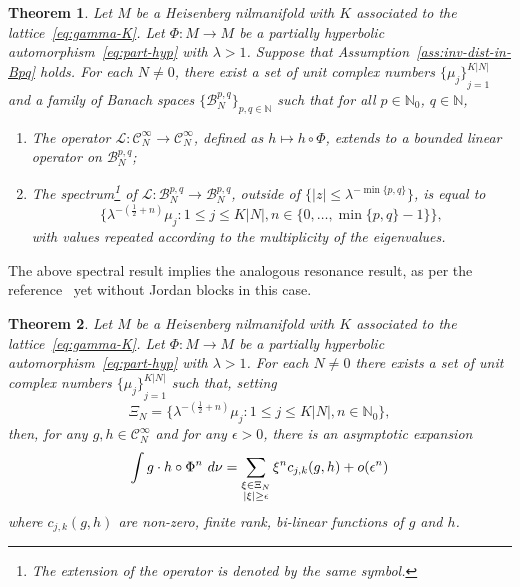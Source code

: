 \documentclass[a4paper,11pt]{amsart}
\newtheorem{theorem}{Theorem}[section]
\theoremstyle{remark}
\newcommand{\abs}[1]{\left|#1\right|} %
\newcommand{\cB}{\mathcal{B}} %
\newcommand{\cC}{\mathcal{C}} %
\newcommand{\cL}{\mathcal{L}} %
\newcommand{\bN}{\mathbb{N}} %
\newcommand{\littleo}[1]{\operatorname{\mathnormal{o}}(#1)} %
\begin{document}
\begin{theorem}
    \label{thm:full-spectrum}
    Let \(M\) be a Heisenberg nilmanifold with \(K\) associated to the lattice~\eqref{eq:gamma-K}.
    Let \(\Phi : M \to M\) be a partially hyperbolic automorphism~\eqref{eq:part-hyp} with \(\lambda > 1\).
    Suppose that Assumption~\ref{ass:inv-dist-in-Bpq} holds.
    For each \(N \neq 0\), there exist a set of unit complex numbers \({\{\mu_j\}}_{j=1}^{K\abs{N}}\) and a family of Banach spaces \(\{\cB_{N}^{p,q}\}_{p,q \in \bN}\) such that for all \(p \in \bN_0\), \(q \in \bN\),
    \begin{enumerate} 
        \item The operator \(\cL : \cC_{N}^\infty \to \cC_{N}^\infty\), defined as \(h \mapsto h \circ \Phi\), extends to a bounded linear operator on \(\cB_{N}^{p,q}\);
        \item The spectrum\footnote{The extension of the operator is denoted by the same symbol.} of \(\cL : \cB_{N}^{p,q} \to \cB_{N}^{p,q}\), outside of \(\{\abs{z} \leq \lambda^{-\min{\{p,q\}}}\}\), is equal to
        \[
            \big\{\lambda^{-(\frac{1}{2} + n)}\mu_{j} : 1 \leq j \leq K \abs{N}, n\in \{0,\ldots,\min{\{p,q\}}-1\} \big\},
        \]
        with values repeated according to the multiplicity of the eigenvalues. 
    \end{enumerate}
\end{theorem}


The above spectral result implies the analogous resonance result, as per the reference~\cite{FGL19} yet without Jordan blocks in this case.

\begin{theorem}
    \label{thm:resonances}
    Let \(M\) be a Heisenberg nilmanifold with \(K\) associated to the lattice~\eqref{eq:gamma-K}.
    Let \(\Phi : M \to M\) be a partially hyperbolic automorphism~\eqref{eq:part-hyp} with \(\lambda > 1\).
    For each \(N \neq 0\) there exists a set of unit complex numbers \({\{\mu_j\}}_{j=1}^{K\abs{N}}\) such that, setting
    \[
        \Xi_N = \big\{\lambda^{-(\frac{1}{2} + n)}\mu_{j} : 1 \leq j \leq K \abs{N}, n\in \bN_{0} \big\},
    \]
    then, for any \(g,h \in \cC^{\infty}_{N}\) and for any \(\epsilon > 0\), there is an asymptotic expansion
    \[
        \int g \cdot h\circ \Phi^n \ d\nu = \sum_{\substack{\xi\in\Xi_N \\ \abs{\xi}\geq \epsilon}} \xi^n  c_{j,k}(g,h) + \littleo{\epsilon^n}
    \]
    where \(c_{j,k}(g,h)\) are non-zero, finite rank, bi-linear functions of $g$ and $h$.
\end{theorem}
\end{document}

